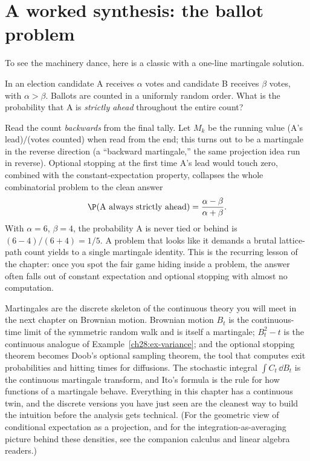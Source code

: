 \section{A worked synthesis: the ballot problem}
\label{ch28:ballot}

To see the machinery dance, here is a classic with a one-line martingale solution.

\begin{example}
\label{ch28:ex-ballot}
In an election candidate A receives $\alpha$ votes and candidate B receives $\beta$ votes, with
$\alpha > \beta$. Ballots are counted in a uniformly random order. What is the probability that A is
\emph{strictly ahead} throughout the entire count?

Read the count \emph{backwards} from the final tally. Let $M_k$ be the running value
(A's lead)$/$(votes counted) when read from the end; this turns out to be a martingale in the reverse
direction (a ``backward martingale,'' the same projection idea run in reverse). Optional stopping at
the first time A's lead would touch zero, combined with the constant-expectation property, collapses the
whole combinatorial problem to the clean answer
\[
  \P(\text{A always strictly ahead}) = \frac{\alpha - \beta}{\alpha + \beta}.
\]
With $\alpha = 6$, $\beta = 4$, the probability A is never tied or behind is $(6-4)/(6+4) = 1/5$. A
problem that looks like it demands a brutal lattice-path count yields to a single martingale identity.
This is the recurring lesson of the chapter: once you spot the fair game hiding inside a problem, the
answer often falls out of constant expectation and optional stopping with almost no computation.
\end{example}

\begin{connectionbox}
Martingales are the discrete skeleton of the continuous theory you will meet in the next chapter on
Brownian motion. Brownian motion $B_t$ is the continuous-time limit of the symmetric random walk and is
itself a martingale; $B_t^2 - t$ is the continuous analogue of Example~\ref{ch28:ex-variance}; and the
optional stopping theorem becomes Doob's optional sampling theorem, the tool that computes exit
probabilities and hitting times for diffusions. The stochastic integral $\int C_t\,\dd B_t$ is the
continuous martingale transform, and Ito's formula is the rule for how functions of a martingale
behave. Everything in this chapter has a continuous twin, and the discrete versions you have just seen
are the cleanest way to build the intuition before the analysis gets technical. (For the geometric view
of conditional expectation as a projection, and for the integration-as-averaging picture behind these
densities, see the companion calculus and linear algebra readers.)
\end{connectionbox}

